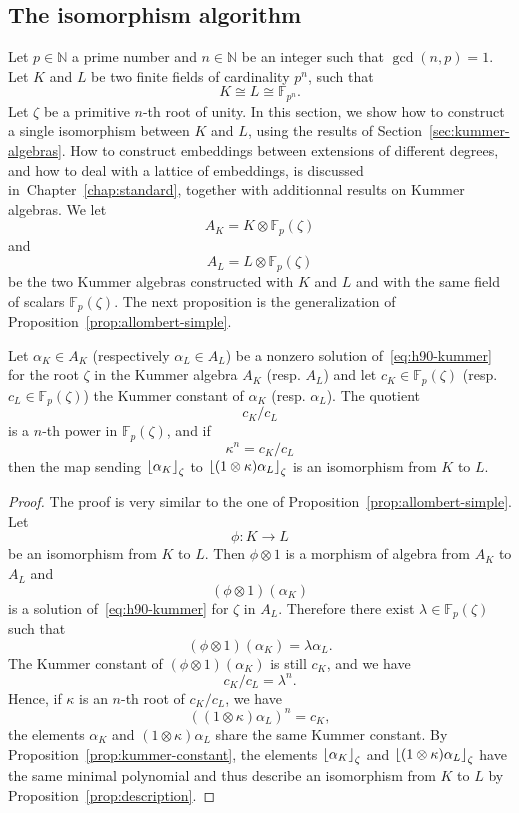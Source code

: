 \subsection{The isomorphism algorithm}
\label{sec:lenstra-allombert-isomorphism}

Let $p\in\mathbb{N}$ a prime number and $n\in\mathbb{N}$ be an integer such that
$\gcd(n, p)=1$. Let $K$ and $L$ be two finite fields of cardinality $p^n$, such
that
\[
  K\cong L\cong \mathbb{F}_{p^n}.
\]
Let $\zeta$ be a primitive $n$-th root of unity. In this section, we show how to
construct a single isomorphism between $K$ and $L$, using the results of
Section~\ref{sec:kummer-algebras}. How to construct embeddings
between extensions of different degrees, and how to deal with a lattice of
embeddings, is discussed in~Chapter~\ref{chap:standard}, together with
additionnal results on Kummer algebras. We let
\[
  A_K = K\otimes\mathbb{F}_p(\zeta)
\]
and
\[
  A_L = L\otimes\mathbb{F}_{p}(\zeta)
\]
be the two Kummer algebras constructed with $K$ and $L$ and with the same field of
scalars $\mathbb{F}_{p}(\zeta)$. The next proposition is the generalization of
Proposition~\ref{prop:allombert-simple}.
\begin{prop}
  \label{prop:lenstra-allombert-algorithm}
 Let $\alpha_K\in A_K$ (respectively $\alpha_L\in A_L$) be a nonzero solution
 of~\eqref{eq:h90-kummer} for the root $\zeta$ in the Kummer algebra $A_K$
 (resp. $A_L$) and let $c_K\in\mathbb{F}_{p}(\zeta)$ (resp.
 $c_L\in\mathbb{F}_p(\zeta)$) the Kummer constant of $\alpha_K$
 (resp. $\alpha_L$). The quotient
 \[
   c_K/c_L
 \]
 is a $n$-th power in $\mathbb{F}_p(\zeta)$, and if
 \[
   \kappa^n = c_K/c_L
 \]
 then the map sending $\left\lfloor \alpha_K \right\rfloor_{\zeta}$ to
 $\left\lfloor (1\otimes\kappa)\alpha_L \right\rfloor_{\zeta}$ is an isomorphism from $K$ to $L$.
\end{prop}
\begin{proof}
  The proof is very similar to the one of
  Proposition~\ref{prop:allombert-simple}. Let
  \[
    \phi:K\to L
  \]
  be an isomorphism from $K$ to $L$. Then $\phi\otimes1$ is a morphism of
  algebra from $A_K$ to $A_L$ and
  \[
    (\phi\otimes1)(\alpha_K)
  \]
  is a solution of~\eqref{eq:h90-kummer} for $\zeta$ in $A_L$. Therefore
  there exist $\lambda\in\mathbb{F}_p(\zeta)$ such that
  \[
    (\phi\otimes1)(\alpha_K) = \lambda\alpha_L.
  \]
  The Kummer constant of $(\phi\otimes1)(\alpha_K)$ is still $c_K$, and we have
  \[
    c_K/c_L = \lambda^n.
  \]
  Hence, if $\kappa$ is an $n$-th root of $c_K/c_L$, we have
  \[
    ((1\otimes\kappa)\alpha_L)^n = c_K,
  \]
  \ie the elements $\alpha_K$ and $(1\otimes\kappa)\alpha_L$ share the same
  Kummer constant. By Proposition~\ref{prop:kummer-constant}, the elements
  $\left\lfloor \alpha_K \right\rfloor_{\zeta}$ and $\left\lfloor (1\otimes\kappa)\alpha_L \right\rfloor_{\zeta}$ have
  the same minimal polynomial and thus describe an isomorphism from $K$ to $L$
  by Proposition~\ref{prop:description}.
\end{proof}
